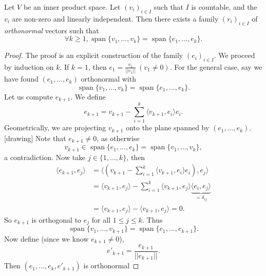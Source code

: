 \documentclass[a4paper]{scrartcl}
\begin{document}
\begin{theorem}
      Let $V$ be an inner product space. Let $\left(v_i\right)_{i \in I}$ such that $I$ is countable, and the $v_i$ are non-zero and linearly independent. Then there exists a family $\left(r_i\right)_{i \in I}$ of \emph{orthonormal} vectors such that 
      \[\forall k \geq 1, \operatorname{span} \{v_1,\ldots ,v_k\}=\operatorname{span} \{e_1,\ldots ,e_k\}.\]
\end{theorem}

\begin{proof}
      The proof is an explicit construction of the family $\left(e_i\right)_{i \in I}$. We proceed by induction on $k$.\newline 
      If $k=1$, then $e_1=\frac{v_1}{||v_1||} \ \left(v_1 \neq 0\right)$. For the general case, say we have found $\left(e_1, \ldots ,e_k\right)$ orthonormal with 
      \[\operatorname{span} \{v_1,\ldots ,v_k\}=\operatorname{span} \{e_1,\ldots ,e_k\}.\]
      Let us compute $e_{k+1}$. We define 
      \[e_{k+1}=v_{k+1}-\sum_{i=1}^{k}\langle v_{k+1},e_i \rangle e_i .\]
      Geometrically, we are projecting $v_{k+1}$ onto the plane spanned by $\left(e_1, \ldots , e_k\right)$.[drawing] Note that $e_{k+1} \neq 0$, as otherwise 
      \[v_{k+1} \in \operatorname{span} \{e_1,\ldots ,e_k\}=\operatorname{span} \{v_1,\ldots ,v_k\},\]
      a contradiction. Now take $j \in \{1,\ldots ,k\}$, then 
      \begin{equation*}
          \begin{split}
               \langle e_{k+1},e_j \rangle&=\langle \left(v_{k+1}-\sum_{i=1}^{k}\langle v_{k+1},e_i \rangle e_i\right) ,e_j \rangle \\
               &=\langle v_{k+1},e_j \rangle - \sum_{i=1}^{k}\langle v_{k+1},e_j \rangle \underbrace{\langle e_i,e_j \rangle}_{=\delta_{ij}}\\
               &=\langle v_{k+1},e_j \rangle-\langle v_{k+1},e_j \rangle=0.
          \end{split}
      \end{equation*}
      So $e_{k+1}$ is orthogonal to $e_j$ for all $1 \leq j \leq k$. Thus 
      \[\operatorname{span} \{v_1,\ldots ,v_{k+1}\}=\operatorname{span} \{e_1,\ldots ,e_{k+1}\}.\]
      Now define (since we know $e_{k+1} \neq 0$), 
      \[e'_{k+1}=\frac{e_{k+1}}{||e_{k+1}||}.\]
      Then $\left(e_1, \ldots ,e_k, e'_{k+1}\right)$ is orthonormal
\end{proof}
\end{document}
